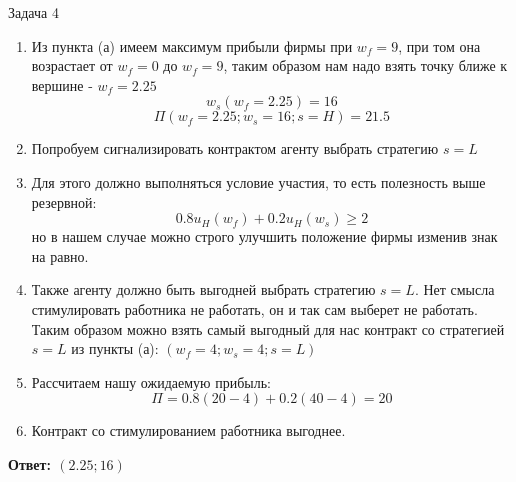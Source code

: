 \begin{mybox}{Задача 4}
\begin{enumerate}
$$\begin{gathered}
          \end{gathered}
        \right.$$
        $$\sqrt{w_f}\leq1.5$$
        $$\begin{cases}
            w_f\leq2.25 \\
            w_f\geq0 \\
        \end{cases}$$
        \item Из пункта (а) имеем максимум прибыли фирмы при $w_f=9$, при том она возрастает от $w_f=0$ до $w_f=9$,
        таким образом нам надо взять точку ближе к вершине - $w_f=2.25$
        $$w_s(w_f=2.25)=16$$
        $$\Pi(w_f=2.25;w_s=16;s=H)=21.5$$
        \item Попробуем сигнализировать контрактом агенту выбрать стратегию $s=L$
        \item Для этого должно выполняться условие участия, то есть полезность выше резервной: $$0.8u_H(w_f)+0.2u_H(
        w_s)\geq2$$ но в нашем случае можно строго улучшить положение фирмы изменив знак на равно.
        \item Также агенту должно быть выгодней выбрать стратегию $s=L$. Нет смысла стимулировать работника
        не работать, он и так сам выберет не работать. Таким
        образом можно взять самый выгодный для нас контракт со стратегией $s=L$ из пункты (а): $(w_f=4; w_s=4; s=L)$
        \item Рассчитаем нашу ожидаемую прибыль: $$\Pi=0.8(20-4)+0.2(40-4)=20$$
        \item Контракт со стимулированием работника выгоднее.
    \end{enumerate}
    \textbf{Ответ: $(2.25;16)$}
\end{mybox}

